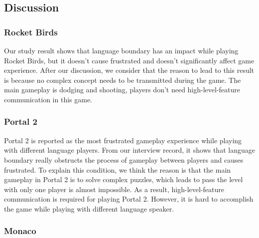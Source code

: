 \subsection{Discussion}
\subsubsection{Rocket Birds}

Our study result shows that language boundary has an impact while playing Rocket Birds, but it doesn't cause frustrated and doesn't significantly affect game experience. After our discussion, we consider that the reason to lead to this result is because no complex concept needs to be transmitted during the game. The main gameplay is dodging and shooting, players don't need high-level-feature communication in this game.


\subsubsection{Portal 2}

Portal 2 is reported as the most frustrated gameplay experience while playing with different language players. From our interview record, it shows that language boundary really obstructs the process of gameplay between players and causes frustrated. To explain this condition, we think the reason is that the main gameplay in Portal 2 is to solve complex puzzles, which leads to pass the level with only one player is almost impossible. As a result, high-level-feature communication is required for playing Portal 2. However, it is hard to accomplish the game while playing with different language speaker.


\subsubsection{Monaco}

